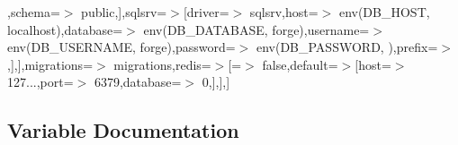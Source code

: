 \begin{DoxyCompactItemize}
\textquotesingle{}\textquotesingle{},\textquotesingle{}schema\textquotesingle{}=$>$ \textquotesingle{}public\textquotesingle{},],\textquotesingle{}sqlsrv\textquotesingle{}=$>$[\textquotesingle{}driver\textquotesingle{}=$>$ \textquotesingle{}sqlsrv\textquotesingle{},\textquotesingle{}host\textquotesingle{}=$>$ env(\textquotesingle{}D\+B\+\_\+\+H\+O\+S\+T\textquotesingle{}, \textquotesingle{}localhost\textquotesingle{}),\textquotesingle{}database\textquotesingle{}=$>$ env(\textquotesingle{}D\+B\+\_\+\+D\+A\+T\+A\+B\+A\+S\+E\textquotesingle{}, \textquotesingle{}forge\textquotesingle{}),\textquotesingle{}username\textquotesingle{}=$>$ env(\textquotesingle{}D\+B\+\_\+\+U\+S\+E\+R\+N\+A\+M\+E\textquotesingle{}, \textquotesingle{}forge\textquotesingle{}),\textquotesingle{}password\textquotesingle{}=$>$ env(\textquotesingle{}D\+B\+\_\+\+P\+A\+S\+S\+W\+O\+R\+D\textquotesingle{}, \textquotesingle{}\textquotesingle{}),\textquotesingle{}prefix\textquotesingle{}=$>$ \textquotesingle{}\textquotesingle{},],],\textquotesingle{}migrations\textquotesingle{}=$>$ \textquotesingle{}migrations\textquotesingle{},\textquotesingle{}redis\textquotesingle{}=$>$[\textquotesingle{}=$>$ false,\textquotesingle{}default\textquotesingle{}=$>$[\textquotesingle{}host\textquotesingle{}=$>$ \textquotesingle{}127...\textquotesingle{},\textquotesingle{}port\textquotesingle{}=$>$ 6379,\textquotesingle{}database\textquotesingle{}=$>$ 0,],],]
\end{DoxyCompactItemize}


\subsection{Variable Documentation}

